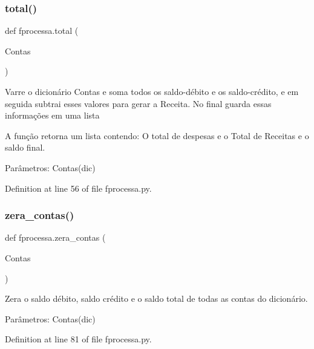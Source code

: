 \mbox{\label{namespacefprocessa_a3607aa92540b4d12f3d2719e11a71a41}} 
\subsubsection{total()}
{\footnotesize\ttfamily def fprocessa.\+total (\begin{DoxyParamCaption}\item[{}]{Contas }\end{DoxyParamCaption})}

\begin{DoxyVerb}Varre o dicionário Contas e soma todos os saldo-débito e os saldo-crédito, e em seguida subtrai esses valores para gerar
a Receita. No final guarda essas informações em uma lista

A função retorna um lista contendo: O total de despesas e o Total de Receitas e o saldo final.

Parâmetros:
Contas(dic)
\end{DoxyVerb}
 

Definition at line 56 of file fprocessa.\+py.

\mbox{\label{namespacefprocessa_a7c8347c696947c8a6533bcae4ad2792f}} 
\subsubsection{zera\_contas()}
{\footnotesize\ttfamily def fprocessa.\+zera\+\_\+contas (\begin{DoxyParamCaption}\item[{}]{Contas }\end{DoxyParamCaption})}

\begin{DoxyVerb}Zera o saldo débito, saldo crédito e o saldo total de todas as contas do dicionário.

Parâmetros:
Contas(dic)
\end{DoxyVerb}
 

Definition at line 81 of file fprocessa.\+py.

